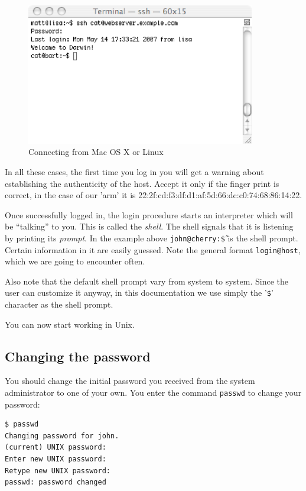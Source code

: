 \documentclass[11pt,a4paper,twoside]{article}
\begin{document}
\begin{figure}[htb]
  \begin{center}
    \includegraphics[width=10cm]{images/macos-logged-in}
    \caption{Connecting from Mac OS X or Linux}
  \end{center}
\end{figure}

In all these cases, the first time you log in you will get a warning about
establishing the authenticity of the host. Accept it only if the finger
print is correct, in the case of our 'arm' it is 
22:2f:cd:f3:df:d1:af:5d:66:dc:c0:74:68:86:14:22.

Once successfully logged in, the login procedure starts an interpreter 
which will be ``talking'' to you. This is called the \emph{shell}. 
The shell signals that it is listening by printing its \emph{prompt}. 
In the example above \texttt{john@cherry:\~\$} is the shell prompt. Certain 
information in it are easily guessed. Note the general format 
\texttt{login@host}, which we are going to encounter often.

Also note that the default shell prompt vary from system to system. Since 
the user can customize it anyway, in this documentation we use simply the 
'\texttt{\$}' character as the shell prompt.

You can now start working in Unix.

\subsection{Changing the password}
You should change the initial password you received from the system 
administrator to one of your own. You enter the command \texttt{passwd} 
to change your password:

\begin{lstlisting}[frame=single]
$ passwd
Changing password for john.
(current) UNIX password: 
Enter new UNIX password:
Retype new UNIX password:
passwd: password changed
\end{lstlisting}
\end{document}
